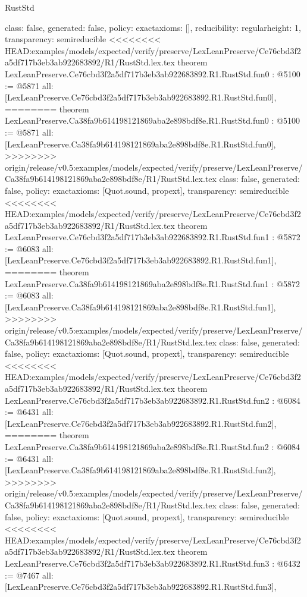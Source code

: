 \begin{lexlean}{RustStd}
\begin{coremodule}
{\begin{coremodule}
{{{  class: false,
  generated: false,
  policy: exact{axioms: []},
  reducibility: regular{height: 1},
  transparency: semireducible
}
<<<<<<<< HEAD:examples/models/expected/verify/preserve/LexLeanPreserve/Ce76cbd3f2a5df717b3eb3ab922683892/R1/RustStd.lex.tex
theorem LexLeanPreserve.Ce76cbd3f2a5df717b3eb3ab922683892.R1.RustStd.fun0 : @5100 := @5871 {
  all: [LexLeanPreserve.Ce76cbd3f2a5df717b3eb3ab922683892.R1.RustStd.fun0],
========
theorem LexLeanPreserve.Ca38fa9b614198121869aba2e898bdf8e.R1.RustStd.fun0 : @5100 := @5871 {
  all: [LexLeanPreserve.Ca38fa9b614198121869aba2e898bdf8e.R1.RustStd.fun0],
>>>>>>>> origin/release/v0.5:examples/models/expected/verify/preserve/LexLeanPreserve/Ca38fa9b614198121869aba2e898bdf8e/R1/RustStd.lex.tex
  class: false,
  generated: false,
  policy: exact{axioms: [Quot.sound, propext]},
  transparency: semireducible
}
<<<<<<<< HEAD:examples/models/expected/verify/preserve/LexLeanPreserve/Ce76cbd3f2a5df717b3eb3ab922683892/R1/RustStd.lex.tex
theorem LexLeanPreserve.Ce76cbd3f2a5df717b3eb3ab922683892.R1.RustStd.fun1 : @5872 := @6083 {
  all: [LexLeanPreserve.Ce76cbd3f2a5df717b3eb3ab922683892.R1.RustStd.fun1],
========
theorem LexLeanPreserve.Ca38fa9b614198121869aba2e898bdf8e.R1.RustStd.fun1 : @5872 := @6083 {
  all: [LexLeanPreserve.Ca38fa9b614198121869aba2e898bdf8e.R1.RustStd.fun1],
>>>>>>>> origin/release/v0.5:examples/models/expected/verify/preserve/LexLeanPreserve/Ca38fa9b614198121869aba2e898bdf8e/R1/RustStd.lex.tex
  class: false,
  generated: false,
  policy: exact{axioms: [Quot.sound, propext]},
  transparency: semireducible
}
<<<<<<<< HEAD:examples/models/expected/verify/preserve/LexLeanPreserve/Ce76cbd3f2a5df717b3eb3ab922683892/R1/RustStd.lex.tex
theorem LexLeanPreserve.Ce76cbd3f2a5df717b3eb3ab922683892.R1.RustStd.fun2 : @6084 := @6431 {
  all: [LexLeanPreserve.Ce76cbd3f2a5df717b3eb3ab922683892.R1.RustStd.fun2],
========
theorem LexLeanPreserve.Ca38fa9b614198121869aba2e898bdf8e.R1.RustStd.fun2 : @6084 := @6431 {
  all: [LexLeanPreserve.Ca38fa9b614198121869aba2e898bdf8e.R1.RustStd.fun2],
>>>>>>>> origin/release/v0.5:examples/models/expected/verify/preserve/LexLeanPreserve/Ca38fa9b614198121869aba2e898bdf8e/R1/RustStd.lex.tex
  class: false,
  generated: false,
  policy: exact{axioms: [Quot.sound, propext]},
  transparency: semireducible
}
<<<<<<<< HEAD:examples/models/expected/verify/preserve/LexLeanPreserve/Ce76cbd3f2a5df717b3eb3ab922683892/R1/RustStd.lex.tex
theorem LexLeanPreserve.Ce76cbd3f2a5df717b3eb3ab922683892.R1.RustStd.fun3 : @6432 := @7467 {
  all: [LexLeanPreserve.Ce76cbd3f2a5df717b3eb3ab922683892.R1.RustStd.fun3],
}}}}}}
\end{coremodule}}
\end{coremodule}
\end{lexlean}
